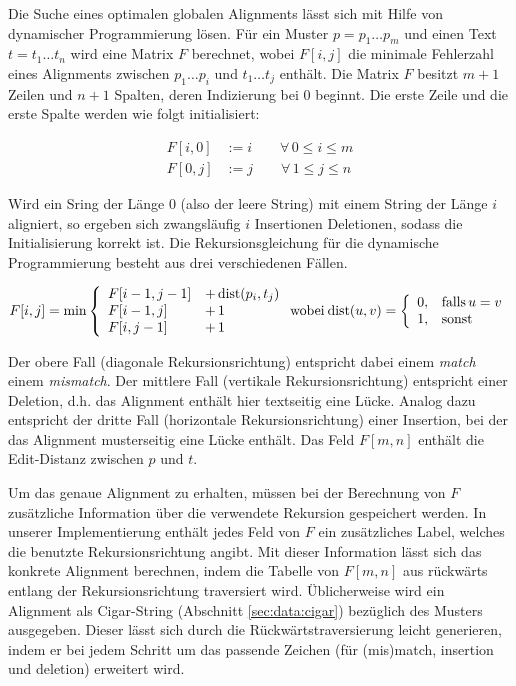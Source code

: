 Die Suche eines optimalen globalen Alignments lässt sich mit Hilfe von dynamischer Programmierung lösen. Für ein Muster $p = p_1 \ldots p_m$ und einen Text $t = t_1 \ldots t_n$ wird eine Matrix $F$ berechnet, wobei $F[i,j]$ die minimale Fehlerzahl eines Alignments zwischen $p_1 \ldots p_i$ und $t_1 \ldots t_j$ enthält. Die Matrix $F$ besitzt $m+1$ Zeilen und $n+1$ Spalten, deren Indizierung bei $0$ beginnt. Die erste Zeile und die erste Spalte werden wie folgt initialisiert:

\begin{align*}
F[i,0] &:= i \qquad \forall \, 0 \leq i \leq m \\
F[0,j] &:= j \qquad \forall \, 1 \leq j \leq n
\end{align*}

Wird ein Sring der Länge $0$ (also der leere String) mit einem String der Länge $i$ aligniert, so ergeben sich zwangsläufig $i$ Insertionen \bzw Deletionen, sodass die Initialisierung korrekt ist. Die Rekursionsgleichung für die dynamische Programmierung besteht aus drei verschiedenen Fällen. 

\[
F[i,j] = \min \left\{\begin{array}{ll} F[i-1,j-1] &+ \, \text{dist}(p_i,t_j)\\ F[i-1,j] &+ \, 1 \\ F[i,j-1] &+ \, 1 \end{array}\right. \mbox{wobei} \: \text{dist}(u,v) = \left\{\begin{array}{cl} 0, & \mbox{falls} \, u = v\\ 1, & \mbox{sonst} \end{array}\right.
\]

Der obere Fall (diagonale Rekursionsrichtung) entspricht dabei einem \textit{match} \bzw einem \textit{mismatch}. Der mittlere Fall (vertikale Rekursionsrichtung) entspricht einer Deletion, d.h. das Alignment enthält hier textseitig eine Lücke. Analog dazu entspricht der dritte Fall (horizontale Rekursionsrichtung) einer Insertion, bei der das Alignment musterseitig eine Lücke enthält. Das Feld $F[m,n]$ enthält die Edit-Distanz zwischen $p$ und $t$. 

Um das genaue Alignment zu erhalten, müssen bei der Berechnung von $F$ zusätzliche Information über die verwendete Rekursion gespeichert werden. In unserer Implementierung enthält jedes Feld von $F$ ein zusätzliches Label, welches die benutzte Rekursionsrichtung angibt. Mit dieser Information lässt sich das konkrete Alignment berechnen, indem die Tabelle von $F[m,n]$ aus rückwärts entlang der Rekursionsrichtung traversiert wird. Üblicherweise wird ein Alignment als Cigar-String (\vgl Abschnitt \ref{sec:data:cigar}) bezüglich des Musters ausgegeben. Dieser lässt sich durch die Rückwärtstraversierung leicht generieren, indem er bei jedem Schritt um das passende Zeichen (für (mis)match, insertion und deletion) erweitert wird.

